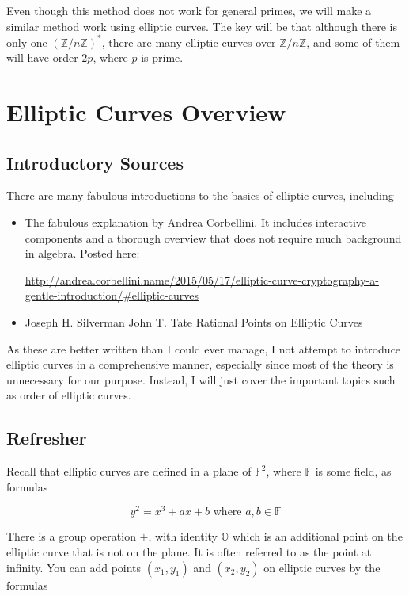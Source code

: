 \documentclass[]{article}
\newcommand{\Z}{\mathbb{Z}}
\newcommand{\OS}{\mathbb{O}}
\newcommand{\ZMZ}[1]{\Z/#1\Z}
\newcommand{\F}{\mathbb{F}}
\begin{document}
Even though this method does not work for general primes, we will make a similar method work using elliptic curves. The key will be that although there is only one $(\ZMZ{n})^*$, there are many elliptic curves over $\ZMZ{n}$, and some of them will have order $2p$, where $p$ is prime.

\section{Elliptic Curves Overview}

\subsection{Introductory Sources}

There are many fabulous introductions to the basics of elliptic curves, including

\begin{itemize}
	\item The fabulous explanation by Andrea Corbellini. It includes interactive components and a thorough overview that does not require much background in algebra. Posted here:

	\url{http://andrea.corbellini.name/2015/05/17/elliptic-curve-cryptography-a-gentle-introduction/#elliptic-curves}
	\item Joseph H. Silverman
	John T. Tate
	Rational
	Points on
	Elliptic Curves
\end{itemize}

As these are better written than I could ever manage, I not attempt to introduce elliptic curves in a comprehensive manner, especially since most of the theory is unnecessary for our purpose. Instead, I will just cover the important topics such as order of elliptic curves.

\subsection{Refresher}

Recall that elliptic curves are defined in a plane of $\F^2$, where $\F$ is some field, as formulas 

$$y^2 = x^3 + ax + b \text{ where }a, b \in \F$$

There is a group operation $+$, with identity $\OS$ which is an additional point on the elliptic curve that is not on the plane. It is often referred to as the point at infinity. You can add points $(x_1,y_1)$ and $(x_2,y_2)$ on elliptic curves by the formulas 
\end{document}
